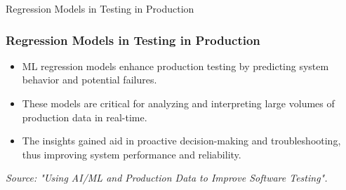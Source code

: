 \begin{frame}{Regression Models in Testing in Production}
    \frametitle{Regression Models in Testing in Production}
    \begin{itemize}
        \item ML regression models enhance production testing by predicting system behavior and potential failures.
        \item These models are critical for analyzing and interpreting large volumes of production data in real-time.
        \item The insights gained aid in proactive decision-making and troubleshooting, thus improving system performance and reliability.    \end{itemize}
    \vspace{0.5cm}
    \center
    \tiny
    \textit{Source: "Using AI/ML and Production Data to Improve Software Testing". \cite{saucelabs_ai_ml_testing}}
\end{frame}




%         
%         
